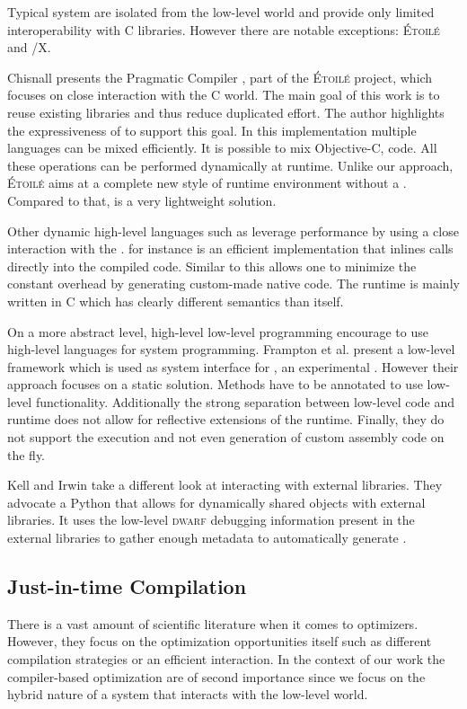 Typical \ST system are isolated from the low-level world and provide only limited interoperability with C libraries.
However there are notable exceptions: \textsc{Étoilé} and \ST/X.

Chisnall presents the Pragmatic \ST Compiler \cite{Chis12a}, part of the \textsc{Étoilé} project, which focuses on close interaction with the C world.
The main goal of this work is to reuse existing libraries and thus reduce duplicated effort.
The author highlights the expressiveness of \ST to support this goal.
In this \ST implementation multiple languages can be mixed efficiently.
It is possible to mix Objective-C, \ST code.
All these operations can be performed dynamically at runtime.
Unlike our approach, \textsc{Étoilé} aims at a complete new style of runtime environment without a \VM.
Compared to that, \NB is a very lightweight solution.

Other dynamic high-level languages such as \Lua leverage \FFI performance by using a close interaction with the \JIT.
 for instance is an efficient \Lua implementation that inlines \FFI calls directly into the \JIT compiled code.
Similar to \NB this allows one to minimize the constant overhead by generating custom-made native code.
The \LuaJIT runtime is mainly written in C which has clearly different semantics than \Lua itself.

On a more abstract level, high-level low-level programming \cite{Fram09a} encourage to use high-level languages for system programming.
Frampton et al. present a low-level framework  which is used as system interface for \Jikes, an experimental \Java \VM.
However their approach focuses on a static solution.
Methods have to be annotated to use low-level functionality.
Additionally the strong separation between low-level code and runtime does not allow for reflective extensions of the runtime.
Finally, they do not support the execution and not even generation of custom assembly code on the fly.

Kell and Irwin \cite{Kell11a} take a different look at interacting with external libraries.
They advocate a Python \VM that allows for dynamically shared objects with external libraries.
It uses the low-level \textsc{dwarf} debugging information present in the external libraries to gather enough metadata to automatically generate \FFIs.


\subsection{Just-in-time Compilation}
There is a vast amount of scientific literature when it comes to \JIT optimizers.
However, they focus on the optimization opportunities itself such as different compilation strategies or an efficient \GC interaction.
In the context of our work the compiler-based optimization are of second importance since we focus on the hybrid nature of a system that interacts with the low-level \VM world.

